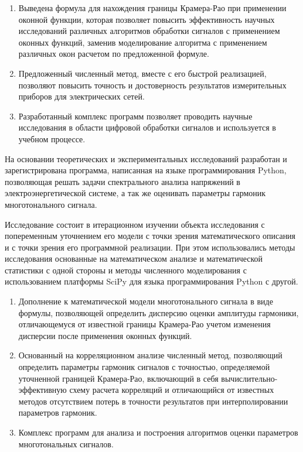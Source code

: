 {\influence} 

\begin{enumerate}
	\item Выведена формула для нахождения границы Крамера-Рао при применении оконной функции, которая позволяет повысить эффективность научных исследований различных алгоритмов обработки сигналов с применением оконных функций, заменив моделирование алгоритма с применением различных окон расчетом по предложенной формуле.
	
	\item Предложенный численный метод, вместе с его быстрой реализацией, позволяют повысить точность и достоверность результатов измерительных приборов для электрических сетей.
	
	\item Разработанный комплекс программ позволяет проводить научные исследования в области цифровой обработки сигналов и используется в учебном процессе.
\end{enumerate}

На основании теоретических и экспериментальных исследований разработан и зарегистрирована программа, написанная на языке программирования Python, позволяющая решать задачи спектрального анализа напряжений в электроэнергетической системе, а так же оценивать параметры гармоник многотонального сигнала.


{\methods} 
Исследование состоит в итерационном изучении объекта исследования с попеременным уточнением его модели с точки зрения математического описания и с точки зрения его программной реализации. При этом использовались методы исследования основанные на математическом анализе и математической статистики с одной стороны и методы численного моделирования с использованием платформы SciPy для языка программирования Python с другой.



{}
\begin{enumerate}
  \item Дополнение к математической модели многотонального сигнала в виде формулы, позволяющей определить дисперсию оценки амплитуды гармоники, отличающемуся от известной границы Крамера-Рао учетом изменения дисперсии после применения оконных функций.
  \item Основанный на корреляционном анализе численный метод, позволяющий определить параметры гармоник сигналов с точностью, определяемой уточненной границей Крамера-Рао, включающий в себя вычислительно-эффективную схему расчета корреляций и отличающийся от известных методов отсутствием потерь в точности результатов при интерполировании параметров гармоник.
  \item Комплекс программ для анализа и построения алгоритмов оценки параметров многотональных сигналов.
\end{enumerate}

